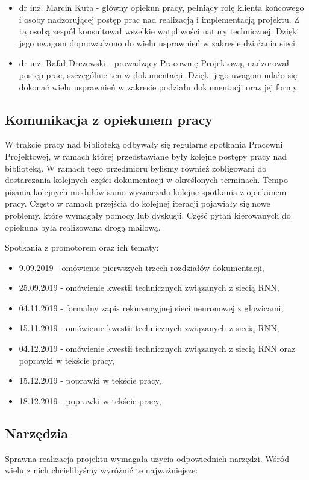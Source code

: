 \begin{itemize}
  \item dr inż. Marcin Kuta - główny opiekun pracy, pełniący rolę klienta końcowego i osoby nadzorującej
  postęp prac nad realizacją i implementacją projektu. Z tą osobą zespół konsultował wszelkie wątpliwości
  natury technicznej. Dzięki jego uwagom doprowadzono do wielu usprawnień w zakresie działania sieci.
  \item dr inż. Rafał Dreżewski - prowadzący Pracownię Projektową, nadzorował postęp prac,
  szczególnie ten w dokumentacji. Dzięki jego uwagom udało się dokonać wielu usprawnień w zakresie podziału
  dokumentacji oraz jej formy.
\end{itemize}

\subsection{Komunikacja z opiekunem pracy}
W trakcie pracy nad biblioteką odbywały się regularne spotkania Pracowni Projektowej, w ramach której
przedstawiane były kolejne postępy pracy nad biblioteką. W ramach tego przedmioru byliśmy również
zobligowani do dostarczania kolejnych części dokumentacji w określonych terminach. Tempo pisania kolejnych modułów
samo wyznaczało kolejne spotkania z opiekunem pracy. Często w ramach przejścia do kolejnej iteracji
pojawiały się nowe problemy, które wymagały pomocy lub dyskusji. Część pytań kierowanych do opiekuna
 była realizowana drogą mailową.

 Spotkania z promotorem oraz ich tematy:
\begin{itemize}
  \item 9.09.2019 - omówienie pierwszych trzech rozdziałów dokumentacji,
  \item 25.09.2019 - omówienie kwestii technicznych związanych z siecią RNN,
  \item 04.11.2019 - formalny zapis rekurencyjnej sieci neuronowej z głowicami,
  \item 15.11.2019 - omówienie kwestii technicznych związanych z siecią RNN,
  \item 04.12.2019 - omówienie kwestii technicznych związanych z siecią RNN oraz poprawki w tekście pracy,
  \item 15.12.2019 - poprawki w tekście pracy,
  \item 18.12.2019 - poprawki w tekście pracy,

\end{itemize}

\subsection{Narzędzia}
Sprawna realizacja projektu wymagała użycia odpowiednich narzędzi. Wśród wielu z nich
chcielibyśmy wyróżnić te najważniejsze:

